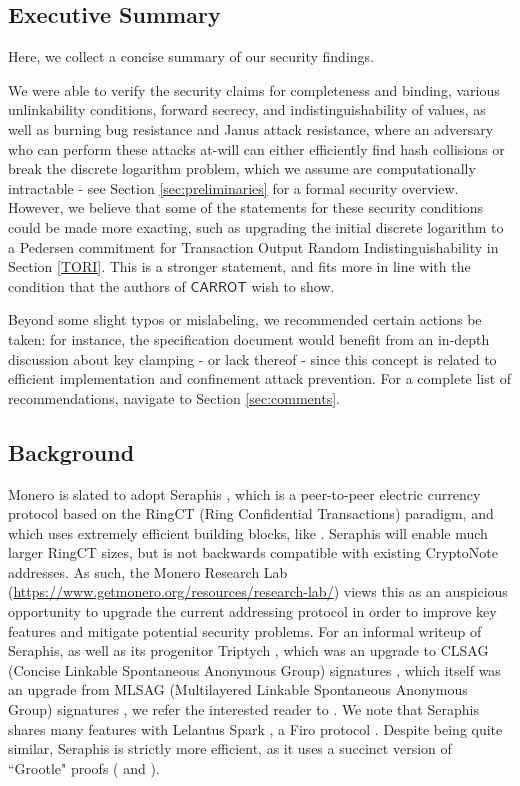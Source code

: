 \documentclass{article}
\theoremstyle{definition}
\newcommand{\6}{\mathbf}
\newcommand{\7}{\mathcal}
\renewcommand{\sf}[1]{{\mathsf{#1}}}
\newcommand{\carr}{$\sf{CARROT}$ }
\begin{document}
 
 \subsection{Executive Summary}

Here, we collect a concise summary of our security findings.
\medskip 

We were able to verify the security claims for completeness and binding, various unlinkability conditions, forward secrecy, and indistinguishability of values, as well as 
burning bug resistance and Janus attack resistance, where an adversary who can perform these attacks at-will can either efficiently find hash collisions or break the discrete logarithm problem, which we assume are computationally intractable - see Section \ref{sec:preliminaries} for a formal security overview. 
However, we believe that some of the statements for these security conditions could be made more exacting, such as upgrading the initial discrete logarithm to a Pedersen commitment for Transaction Output Random Indistinguishability in Section \ref{TORI}. 
This is a stronger statement, and fits more in line with the condition that the authors of \carr wish to show.
\medskip 

Beyond some slight typos or mislabeling, we recommended certain actions be taken: for instance, the specification document would benefit from an in-depth discussion about key clamping - or lack thereof - since this concept is related to efficient implementation and confinement attack prevention. 
For a complete list of recommendations, navigate to Section \ref{sec:comments}.





\subsection{Background}\label{sec:background}

Monero is slated to adopt Seraphis \cite{Seraphis}, which is a peer-to-peer electric currency protocol based on the RingCT (Ring Confidential Transactions) \cite{ZtoM} paradigm, and which uses extremely efficient building blocks, like \cite{Bullet,Bullet+}. 
Seraphis will enable much larger RingCT sizes, but is not backwards compatible with existing CryptoNote addresses.
As such, the Monero Research Lab (\url{https://www.getmonero.org/resources/research-lab/}) views this as an auspicious opportunity to upgrade the current addressing protocol in order to improve key features and mitigate potential security problems.
For an informal writeup of Seraphis, as well as its progenitor Triptych \cite{Triptych}, which was an upgrade to CLSAG (Concise Linkable Spontaneous Anonymous Group) signatures \cite{CLSAG,MoneropediaCLSAG}, which itself was an upgrade from MLSAG (Multilayered Linkable Spontaneous Anonymous Group) signatures \cite{MLSAG}, we refer the interested reader to \cite{WhatIsSeraphis}. 
We note that Seraphis shares many features with Lelantus Spark \cite{Lelantus,Spark}, a Firo protocol \cite{FiroLelantus}. 
Despite being quite similar, Seraphis is strictly more efficient, as it uses a succinct version of ``Grootle" proofs (\cite{Groth} and \cite{Bootle}).
\medskip 
\end{document}
